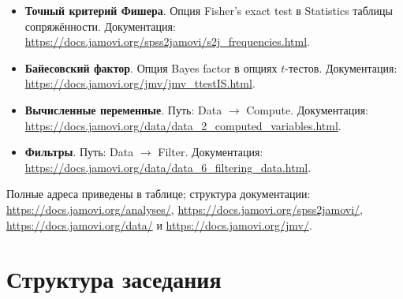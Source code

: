 \documentclass[11pt,a4paper]{article}
\begin{document}
\begin{tcolorbox}[title={Карта критериев в Jamovi}]
\begin{itemize}
\item \textbf{Точный критерий Фишера}. Опция Fisher's exact test в Statistics таблицы сопряжённости. Документация: \url{https://docs.jamovi.org/spss2jamovi/s2j_frequencies.html}.
\item \textbf{Байесовский фактор}. Опция Bayes factor в опциях $t$-тестов. Документация: \url{https://docs.jamovi.org/jmv/jmv_ttestIS.html}.
\item \textbf{Вычисленные переменные}. Путь: Data $\to$ Compute. Документация: \url{https://docs.jamovi.org/data/data_2_computed_variables.html}.
\item \textbf{Фильтры}. Путь: Data $\to$ Filter. Документация: \url{https://docs.jamovi.org/data/data_6_filtering_data.html}.
\end{itemize}
Полные адреса приведены в таблице; структура документации: \url{https://docs.jamovi.org/analyses/}, \url{https://docs.jamovi.org/spss2jamovi/}, \url{https://docs.jamovi.org/data/} и \url{https://docs.jamovi.org/jmv/}.
\end{tcolorbox}

\section*{Структура заседания}
\end{document}
